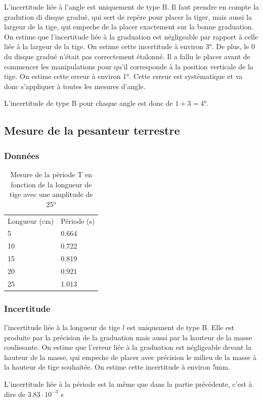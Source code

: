 \documentclass[a4paper,10pt,french]{scrartcl}
\begin{document}
L'incertitude liée à l'angle est uniquement de type B. Il faut prendre en compte la gradution di disque gradué, qui sert de repère pour placer la tiger, mais aussi la largeur de la tige, qui empeche de la placer exactement sur la bonne graduation. On estime que l'incertitude liée à la graduation est négligeable par rapport à celle liée à la largeur de la tige. On estime cette incertitude à environ 3°. De plus, le 0 du disque gradué n'était pas correctement étalonné. Il a fallu le placer avant de commencer les manipulations pour qu'il corresponde à la position verticale de la tige. On estime cette erreur à environ 1°. Cette erreur est systématique et va donc s'appliquer à toutes les mesures d'angle.

L'incertitude de type B pour chaque angle est donc de \(1+3 = 4\)°.
\subsection{Mesure de la pesanteur terrestre}
\subsubsection{Données}
\begin{table}[H]
\begin{center}
\begin{tabular}{ll}
Longueur (cm) & Période (s)\\
5 & 0.664\\
10 & 0.722\\
15 & 0.819\\
20 & 0.921\\
25 & 1.013
\end{tabular}
\end{center}
\caption{Mesure de la période T en fonction de la longueur de tige avec une amplitude de 25°}
\end{table}
\subsubsection{Incertitude}
l'incertitude liée à la longueur de tige \(l\) est uniquement de type B. Elle est produite par la précision de la graduation mais aussi par la hauteur de la masse coulissante. On estime que l'erreur liée à la graduation est négligeable devant la hauteur de la masse, qui empeche de placer avec précision le milieu de la masse à la hauteur de tige souhaitée. On estime cette incertitude à environ 5mm.

L'incertitude liée à la période est la m\^eme que dans la partie précédente, c'est à dire de \(3.83\cdot 10^{-3}\) s
\end{document}
